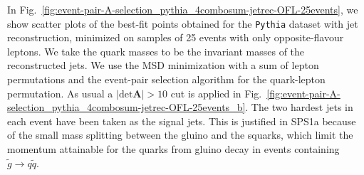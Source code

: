 \documentclass[twoside,english]{uiofysmaster}
\begin{document}
In Fig.\ \ref{fig:event-pair-A-selection_pythia_4combosum-jetrec-OFL-25events}, we show scatter plots of the best-fit points obtained for the {\tt Pythia} dataset with jet reconstruction, minimized on samples of 25 events with only opposite-flavour leptons. We take the quark masses to be the invariant masses of the reconstructed jets. We use the MSD minimization with a sum of lepton permutations and the event-pair selection algorithm for the quark-lepton permutation. As usual a $|\mathrm{det}\mathbf A|>10$ cut is applied in Fig.\ \ref{fig:event-pair-A-selection_pythia_4combosum-jetrec-OFL-25events_b}. The two hardest jets in each event have been taken as the signal jets. This is justified in SPS1a because of the small mass splitting between the gluino and the squarks, which limit the momentum attainable for the quarks from gluino decay in events containing $\tilde g \to q\tilde q$. 
\end{document}
